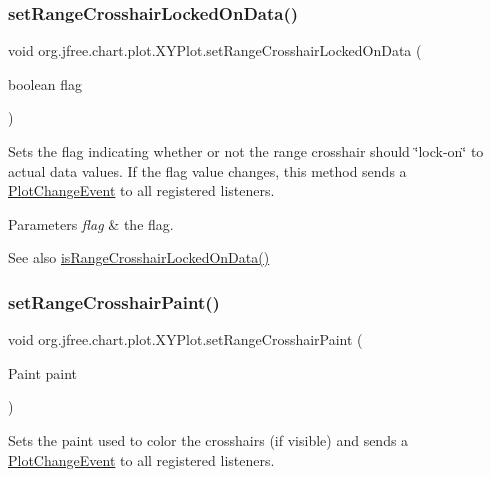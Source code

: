 \subsubsection{\texorpdfstring{set\+Range\+Crosshair\+Locked\+On\+Data()}{setRangeCrosshairLockedOnData()}}
{\footnotesize\ttfamily void org.\+jfree.\+chart.\+plot.\+X\+Y\+Plot.\+set\+Range\+Crosshair\+Locked\+On\+Data (\begin{DoxyParamCaption}\item[{boolean}]{flag }\end{DoxyParamCaption})}

Sets the flag indicating whether or not the range crosshair should \char`\"{}lock-\/on\char`\"{} to actual data values. If the flag value changes, this method sends a \mbox{\hyperlink{}{Plot\+Change\+Event}} to all registered listeners.


\begin{DoxyParams}{Parameters}
{\em flag} & the flag.\\
\hline
\end{DoxyParams}
\begin{DoxySeeAlso}{See also}
\mbox{\hyperlink{classorg_1_1jfree_1_1chart_1_1plot_1_1_x_y_plot_accbd1041d24c450ed59fe379584ae4b8}{is\+Range\+Crosshair\+Locked\+On\+Data()}} 
\end{DoxySeeAlso}
\mbox{\label{classorg_1_1jfree_1_1chart_1_1plot_1_1_x_y_plot_abea680edc849d51e1dfab077c33e8c61}} 
\subsubsection{\texorpdfstring{set\+Range\+Crosshair\+Paint()}{setRangeCrosshairPaint()}}
{\footnotesize\ttfamily void org.\+jfree.\+chart.\+plot.\+X\+Y\+Plot.\+set\+Range\+Crosshair\+Paint (\begin{DoxyParamCaption}\item[{Paint}]{paint }\end{DoxyParamCaption})}

Sets the paint used to color the crosshairs (if visible) and sends a \mbox{\hyperlink{}{Plot\+Change\+Event}} to all registered listeners.


